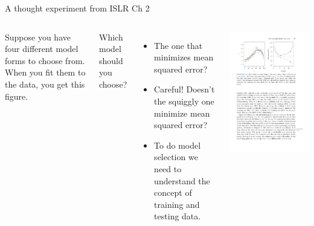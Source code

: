 \documentclass[aspectratio=169, handout]{beamer}
\begin{document}
\begin{frame}{A thought experiment from ISLR Ch 2}

\begin{columns}
Suppose you have four different model forms to choose from.  When you fit them to the data, you get this figure.

\vspace{5mm}

Which model should you choose?  
\begin{itemize}
\item<2-> The one that minimizes mean squared error?
\item<3-> Careful!  Doesn't the squiggly one minimize mean squared error?
\item<4-> To do model selection we need to understand the concept of training and testing data.
\end{itemize}

\includegraphics[scale=1]{figures/islr2_9a.pdf}
\end{columns}

\end{frame}
\end{document}
